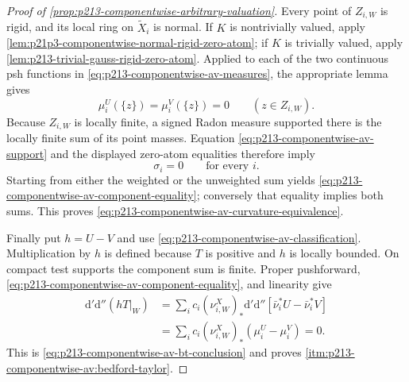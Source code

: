 \begin{proof}[Proof of
\cref{prop:p213-componentwise-arbitrary-valuation}]
Every point of $Z_{i,W}$ is rigid, and its local ring on
$\widetilde X_i$ is normal.  If $K$ is nontrivially valued, apply
\cref{lem:p21p3-componentwise-normal-rigid-zero-atom}; if $K$ is
trivially valued, apply
\cref{lem:p213-trivial-gauss-rigid-zero-atom}.  Applied to each of the two
continuous psh functions in
\eqref{eq:p213-componentwise-av-measures}, the appropriate lemma gives
\[
                         \mu_i^U(\{z\})
                         =\mu_i^V(\{z\})=0
                         \qquad(z\in Z_{i,W}).
\]
Because $Z_{i,W}$ is locally finite, a signed Radon measure supported there
is the locally finite sum of its point masses.  Equation
\eqref{eq:p213-componentwise-av-support} and the displayed zero-atom
equalities therefore imply
\begin{equation}
 \label{eq:p213-componentwise-av-component-equality}
                            \sigma_i=0
                            \qquad\text{for every }i.
\end{equation}
Starting from either the weighted or the unweighted sum yields
\eqref{eq:p213-componentwise-av-component-equality}; conversely that
equality implies both sums.  This proves
\eqref{eq:p213-componentwise-av-curvature-equivalence}.

Finally put $h=U-V$ and use
\eqref{eq:p213-componentwise-av-classification}.  Multiplication by $h$ is
defined because $T$ is positive and $h$ is locally bounded.  On compact
test supports the component sum is finite.  Proper pushforward,
\eqref{eq:p213-componentwise-av-component-equality}, and linearity give
\begin{align*}
 \mathrm d'\mathrm d''(hT|_W)
 &=\sum_i c_i(\nu_{i,W}^X)_*
       \mathrm d'\mathrm d''[\bar\nu_i^*U-\bar\nu_i^*V]\\
 &=\sum_i c_i(\nu_{i,W}^X)_*(\mu_i^U-\mu_i^V)=0.
\end{align*}
This is \eqref{eq:p213-componentwise-av-bt-conclusion} and proves
\cref{itm:p213-componentwise-av:bedford-taylor}.
\end{proof}
